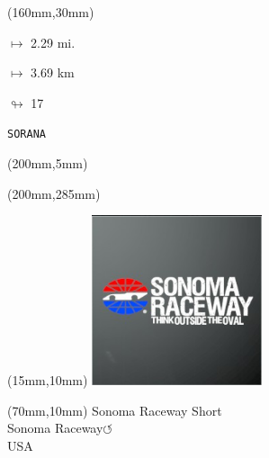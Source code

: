 \begin{textblock*}{40mm}(160mm,30mm)%
\Large
\par$\mapsto$ 2.29 mi.
\par$\mapsto$ 3.69 km
\par$\looparrowright$ 17
\par\hfill\tiny\tt SORANA\\
\end{textblock*}
\begin{textblock*}{20mm}(200mm,5mm)%
\fbox{\thepage}
\label{SORANA}
\end{textblock*}
\begin{textblock*}{20mm}(200mm,285mm)%
\fbox{\thepage}
\end{textblock*}

\null\newpage
\begin{textblock*}{50mm}(15mm,10mm)%
\includegraphics[width=50mm]{LG/2015-05-20_00096.png}
\end{textblock*}
\begin{textblock*}{130mm}(70mm,10mm)%
{\fontsize{20}{20}\selectfont Sonoma Raceway Short\\}
{\fontsize{16}{16}\selectfont Sonoma Raceway\hfill \huge$\circlearrowleft$\\}
{\fontsize{12}{12}\selectfont USA\\}
\end{textblock*}
